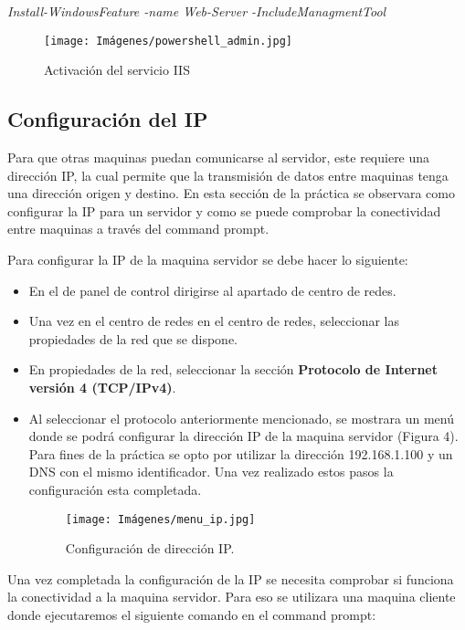 \documentclass[letterpaper,12pt]{article} %
\begin{document}
\textit{Install-WindowsFeature -name Web-Server -IncludeManagmentTool}


\begin{figure}[htp!]
    \centering
    \texttt{[image: Imágenes/powershell\_admin.jpg]}
    \caption{Activación del servicio IIS}
    \label{fig:activacion_iis}
\end{figure}


\newpage

\subsection{Configuración del IP}
Para que otras maquinas puedan comunicarse al servidor, este requiere una dirección IP, la cual permite que la transmisión de datos entre maquinas tenga una dirección origen y destino. En esta sección de la práctica se observara como configurar la IP para un servidor y como se puede comprobar la conectividad entre maquinas a través del command prompt.

Para configurar la IP de la maquina servidor se debe hacer lo siguiente:

\begin{itemize}
    \item En el de panel de control dirigirse al apartado de centro de redes.
    \item Una vez en el centro de redes en el centro de redes, seleccionar las propiedades de la red que se dispone.
    \item En propiedades de la red, seleccionar la sección \textbf{Protocolo de Internet versión 4 (TCP/IPv4)}. 
    \item Al seleccionar el protocolo anteriormente mencionado, se mostrara un menú donde se podrá configurar la dirección IP de la maquina servidor (Figura 4). Para fines de la práctica se opto por utilizar la dirección 192.168.1.100 y un DNS con el mismo identificador. Una vez realizado estos pasos la configuración esta completada.
    
    \begin{figure}[htp!]
        \centering
        \texttt{[image: Imágenes/menu\_ip.jpg]}
        \caption{Configuración de dirección IP.}
        \label{fig:menu_ip}
    \end{figure}
    
\end{itemize}

Una vez completada la configuración de la IP se necesita comprobar si funciona la conectividad a la maquina servidor. Para eso se utilizara una maquina cliente donde ejecutaremos el siguiente comando en el command prompt:\par
\end{document}
